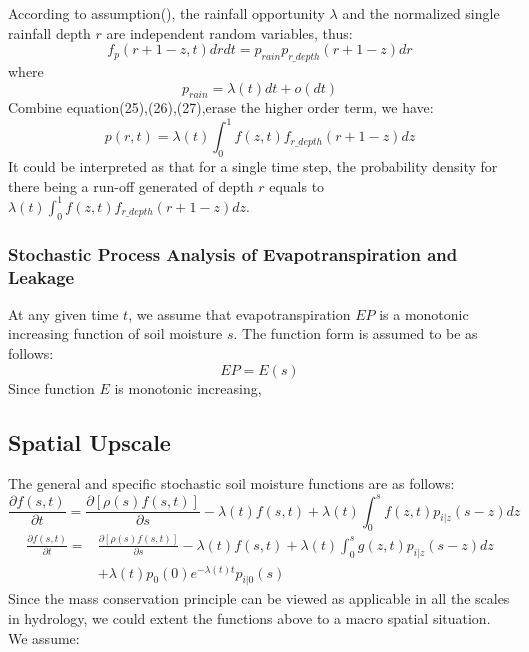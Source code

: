 \documentclass[11pt]{article}
\begin{document}
According to assumption(), the rainfall opportunity $\lambda$ and the normalized single rainfall depth $r$ are independent random variables, thus:
\begin{equation}
f_p(r+1-z,t)drdt=p_{rain}p_{r\_depth}(r+1-z)dr
\end{equation}
where
\begin{equation}
p_{rain}=\lambda(t)dt+o(dt)
\end{equation}
Combine equation(25),(26),(27),erase the higher order term, we have:
 \begin{equation}
 p(r,t)=\lambda(t)\int_{0}^{1} f(z,t)f_{r\_depth}(r+1-z)dz
 \end{equation} 
It could be interpreted as that for a single time step, the probability density for there being a run-off generated of depth $r$ equals to $\lambda(t)\int_{0}^{1} f(z,t)f_{r\_depth}(r+1-z)dz$.

 \subsubsection{Stochastic Process Analysis of Evapotranspiration and Leakage}
At any given time $t$, we assume that evapotranspiration $EP$ is a monotonic increasing function of soil moisture $s$. The function form is assumed to be as follows:
\begin{equation}
EP=E(s)
\end{equation}
Since function $E$ is monotonic increasing, 

\begin{center}
\section{Spatial Upscale}
\end{center}

The general and specific stochastic soil moisture functions are as follows:
\begin{equation}
\frac{\partial{f(s,t)}}{\partial t}=\frac{\partial{[\rho(s)f(s,t)]}}{\partial s}-\lambda(t)f(s,t)+\lambda(t)\int_{0}^{s} f(z,t)p_{i|z}(s-z)dz
\end{equation}
\begin{equation}
 \begin{split}
 \frac{\partial{f(s,t)}}{\partial t}=&\frac{\partial{[\rho(s)f(s,t)]}}{\partial s}-\lambda(t)f(s,t)+\lambda(t)\int_{0}^{s} g(z,t)p_{i|z}(s-z)dz\\&+\lambda(t)p_0(0)e^{-\lambda(t) t}p_{i|0}(s)
 \end{split}
 \end{equation}
Since the mass conservation principle can be viewed as applicable in all the scales in hydrology, we could extent the functions above to a macro spatial situation. 
We assume:
\end{document}
